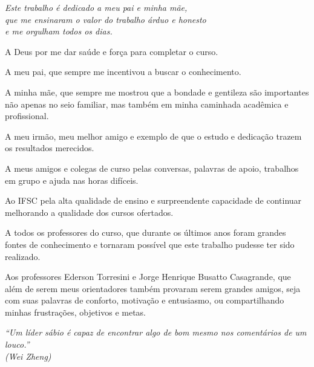 \documentclass[
	12pt,				%
	openright,			%
	twoside,			%
	a4paper,			%
	chapter=TITLE,		%
	english,			%
	brazil				%
	]{abntex2}
\begin{document}
\begin{dedicatoria}
   \vspace*{\fill}
   \begin{flushright}
   \noindent
   \textit{ Este trabalho é dedicado a meu pai e minha mãe,\\que me ensinaram o valor do trabalho árduo e honesto\\e me orgulham todos os dias.}\vspace*{2cm}
   \end{flushright}
\end{dedicatoria}

\begin{agradecimentos}

A Deus por me dar saúde e força para completar o curso.

A meu pai, que sempre me incentivou a buscar o conhecimento.

A minha mãe, que sempre me mostrou que a bondade e gentileza são importantes não apenas no seio familiar, mas também em minha caminhada acadêmica e profissional.

A meu irmão, meu melhor amigo e exemplo de que o estudo e dedicação trazem os resultados merecidos.

A meus amigos e colegas de curso pelas conversas, palavras de apoio, trabalhos em grupo e ajuda nas horas difíceis.

Ao IFSC pela alta qualidade de ensino e surpreendente capacidade de continuar melhorando a qualidade dos cursos ofertados.

A todos os professores do curso, que durante os últimos anos foram grandes fontes de conhecimento e tornaram possível que este trabalho pudesse ter sido realizado.

Aos professores Ederson Torresini e Jorge Henrique Busatto Casagrande, que além de serem meus orientadores também provaram serem grandes amigos, seja com suas palavras de conforto, motivação e entusiasmo, ou compartilhando minhas frustrações, objetivos e metas.

\end{agradecimentos}

\begin{epigrafe}
    \vspace*{\fill}
	\begin{flushright}
		\textit{``Um líder sábio é capaz de encontrar algo de bom mesmo nos comentários de um louco.''\\
		(Wei Zheng)}
	\end{flushright}
\end{epigrafe}
\end{document}
